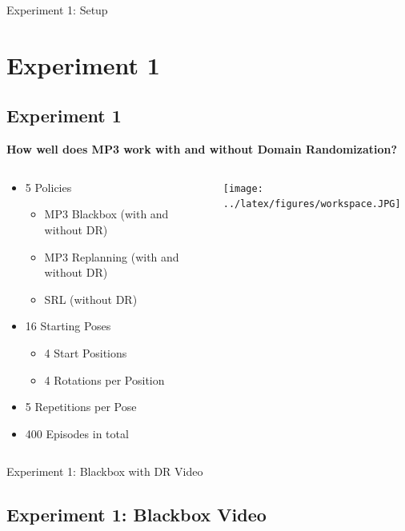 \documentclass[16:9,en,navbarinfooter]{sdqbeamer}
\begin{document}
\begin{frame}{Experiment 1: Setup}
	\section{Experiment 1}
	\subsection{Experiment 1}

	\begin{center}
		\vspace{1cm}
		\textbf{How well does MP3 work with and without Domain Randomization?}
	\end{center}

	\begin{columns}[t]
		\begin{column}{0.5\textwidth}
			\vspace{.1cm}
			\begin{itemize}
				\item 5 Policies
				      \begin{itemize}
					      \item MP3 Blackbox (with and without DR)
					      \item MP3 Replanning (with and without DR)
					      \item SRL (without DR)
				      \end{itemize}
				\item 16 Starting Poses
				      \begin{itemize}
					      \item 4 Start Positions
					      \item 4 Rotations per Position
				      \end{itemize}
				\item 5 Repetitions per Pose
				\item 400 Episodes in total
			\end{itemize}
		\end{column}
		\begin{column}{0.5\textwidth}
			\vspace{.1cm}
			\texttt{[image: ../latex/figures/workspace.JPG]}
		\end{column}


	\end{columns}
\end{frame}
\begin{frame}{Experiment 1: Blackbox with DR Video}
	\subsection{Experiment 1: Blackbox Video}

	\begin{columns}[t]
		\vspace{1cm}

	\end{columns}
\end{frame}
\end{document}
